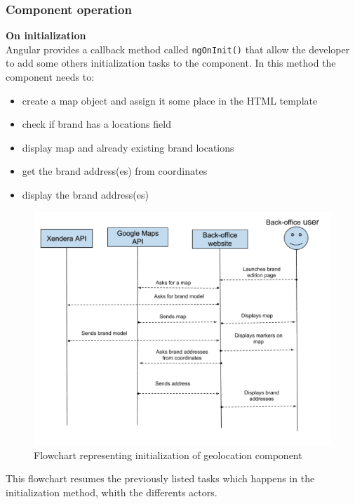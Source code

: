 \documentclass{article}
\begin{document}
                    
                \subsubsection{Component operation}
                    \textbf{On initialization}\\
                    Angular provides a callback method called \texttt{ngOnInit()} that allow the developer to add some others initialization
                    tasks to the component. In this method the component needs to:
                    \begin{itemize}
                        \item{create a map object and assign it some place in the HTML template}
                        \item{check if brand has a locations field}
                        \item{display map and already existing brand locations}
                        \item{get the brand address(es) from coordinates}
                        \item{display the brand address(es)}
                    \end{itemize}
                    \begin{figure}[H]
                        \includegraphics[width=\textwidth]{init.png}
                        \caption{Flowchart representing initialization of geolocation component}
                    \end{figure}
                    This flowchart resumes the previously listed tasks which happens in the initialization method, whith the differents actors.\\
                    
\end{document}
